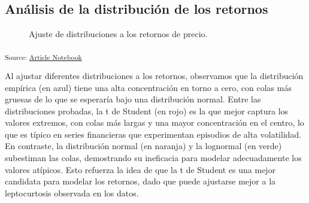 \documentclass[
  number,
  preprint,
  3p,
  onecolumn]{elsarticle}
\begin{document}
\subsection{Análisis de la distribución de los
retornos}\label{sec-distribucion-retornos}

\begin{figure}[H]


\caption{\label{fig-distribution-fitting}Ajuste de distribuciones a los
retornos de precio.}

\end{figure}%

\textsubscript{Source:
\href{https://iancont.github.io/fixed_income_garch/index.qmd.html}{Article
Notebook}}

Al ajustar diferentes distribuciones a los retornos, observamos que la
distribución empírica (en azul) tiene una alta concentración en torno a
cero, con colas más gruesas de lo que se esperaría bajo una distribución
normal. Entre las distribuciones probadas, la t de Student (en rojo) es
la que mejor captura los valores extremos, con colas más largas y una
mayor concentración en el centro, lo que es típico en series financieras
que experimentan episodios de alta volatilidad. En contraste, la
distribución normal (en naranja) y la lognormal (en verde) subestiman
las colas, demostrando su ineficacia para modelar adecuadamente los
valores atípicos. Esto refuerza la idea de que la t de Student es una
mejor candidata para modelar los retornos, dado que puede ajustarse
mejor a la leptocurtosis observada en los datos.
\end{document}
